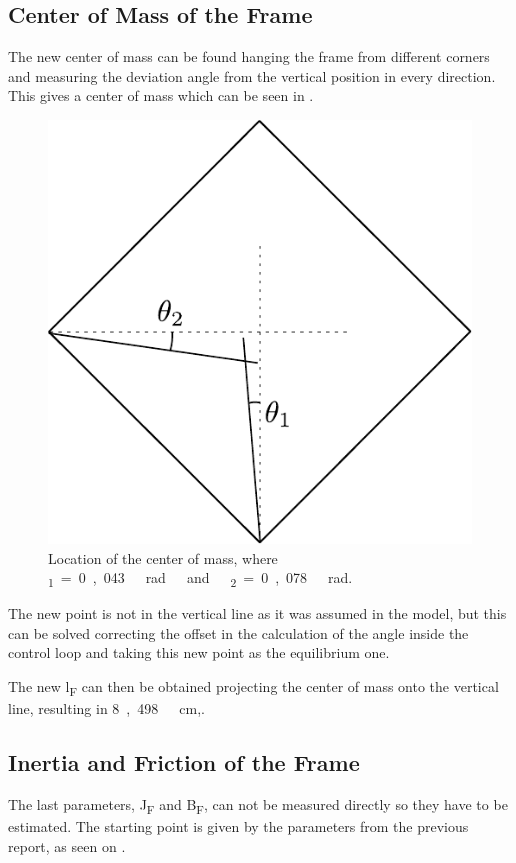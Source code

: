 \subsection{Center of Mass of the Frame}
The new center of mass can be found hanging the frame from different corners and measuring the deviation angle from the vertical position in every direction. This gives a center of mass which can be seen in . 
\begin{figure}[H]
	\centering
	\includegraphics[scale=0.6]{figures/centerOfMassDiagram}
	\caption{Location of the center of mass, where \si{\theta_1=0,043\ rad\ and\ \theta_2=0,078\ rad}.}
	\label{centerOfMassDiagram}
\end{figure}

The new point is not in the vertical line as it was assumed in the model, but this can be solved correcting the offset in the calculation of the angle inside the control loop and taking this new point as the equilibrium one. 

The new \si{l_F} can then be obtained projecting the center of mass onto the vertical line, resulting in \si{8,498\ cm},.

\subsection{Inertia and Friction of the Frame}
The last parameters, \si{J_F} and \si{B_F}, can not be measured directly so they have to be estimated. The starting point is given by the parameters from the previous report, as seen on \cite{SVJohansen}.

